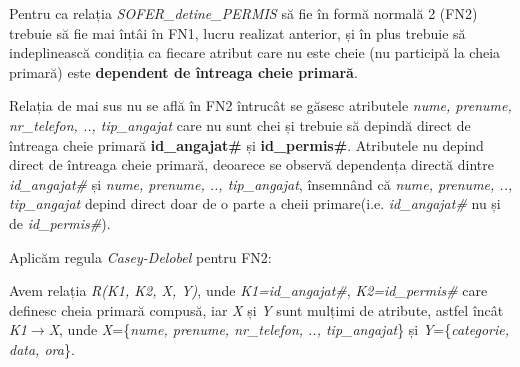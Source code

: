 \documentclass[12pt, a4paper]{article}
\begin{document}
\begin{table}[!htbp]
\caption{Transformarea în FN1}\label{tab2}
\end{table}

Pentru ca relația \emph{SOFER\_detine\_PERMIS} să fie în formă normală 2 (FN2) trebuie să fie mai întâi în FN1, lucru realizat anterior, și în plus trebuie să indeplinească condiția ca fiecare atribut care nu este cheie (nu participă la cheia primară) este \textbf{dependent de întreaga cheie primară}.

Relația de mai sus nu se află în FN2 întrucât se găsesc atributele \emph{nume, prenume, nr\_telefon, .., tip\_angajat} care nu sunt chei și trebuie să depindă direct de întreaga cheie primară \textbf{id\_angajat\#} și \textbf{id\_permis\#}. Atributele nu depind direct de întreaga cheie primară, deoarece se observă dependența directă dintre \emph{id\_angajat\#} și \emph{nume, prenume, .., tip\_angajat}, însemnând că \emph{nume, prenume, .., tip\_angajat} depind direct doar de o parte a cheii primare(i.e. \emph{id\_angajat\#} nu și de \emph{id\_permis\#}).

Aplicăm regula \emph{Casey-Delobel} pentru FN2:

Avem relația \emph{R(K1, K2, X, Y)}, unde \emph{K1=id\_angajat\#}, \emph{K2=id\_permis\#} care definesc cheia primară compusă, iar \emph{X} și \emph{Y} sunt mulțimi de atribute, astfel încât \emph{K1}$\rightarrow$\emph{X}, unde \emph{X}=\{\emph{nume, prenume, nr\_telefon, .., tip\_angajat}\} și \emph{Y}=\{\emph{categorie, data, ora}\}.
\end{document}
